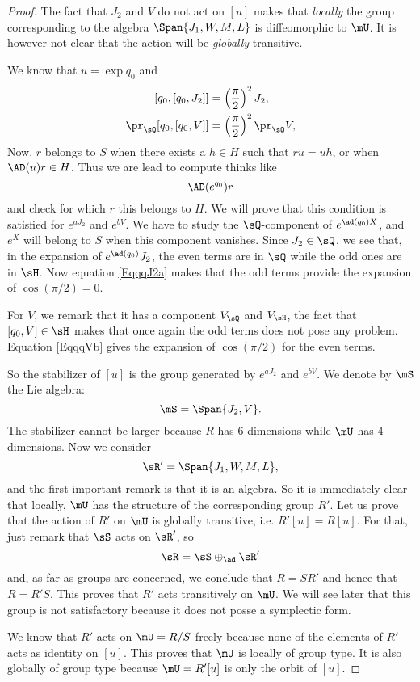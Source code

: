 \begin{proof}
The fact that $J_{2}$ and $V$ do not act on $[u]$ makes that \emph{locally} the group corresponding to the algebra $\Span\{ J_{1},W,M,L \}$ is diffeomorphic to $\mU$. It is however not clear that the action will be \emph{globally} transitive.

We know that $u=\exp q_0$ and
\begin{subequations}
\begin{align}
[q_0,[q_0,J_{2}]]&=\left( \frac{ \pi }{2} \right)^{2}J_{2},         \label{EqqqJ2a} \\
\pr_{\sQ}[q_0,[q_0,V]]&=\left( \frac{ \pi }{2} \right)^{2}\pr_{\sQ}V,       \label{EqqqVb}
\end{align}
\end{subequations}
Now, $r$ belongs to $S$ when there exists a $h\in H$ such that $ru=uh$, or when $\AD(u)r\in H$. Thus we are lead to compute thinks like
\[
  \AD( e^{q_0})r
\]
and check for which $r$ this belongs to $H$. We will prove that this condition is satisfied for $ e^{aJ_{2}}$ and $ e^{bV}$. We have to study the $\sQ$-component of $ e^{\ad(q_0)X}$, and $ e^{X}$ will belong to $S$ when this component vanishes. Since $J_2\in\sQ$, we see that, in the expansion of $ e^{\ad(q_0)}J_2$, the even terms are in $\sQ$ while the odd ones are in $\sH$. Now equation \eqref{EqqqJ2a} makes that the odd terms provide the expansion of $\cos(\pi/2)=0$.

For $V$, we remark that it has a component $V_{\sQ}$ and $V_{\sH}$, the fact that $[q_0,V]\in\sH$ makes that once again the odd terms does not pose any problem. Equation \eqref{EqqqVb} gives the expansion of $\cos(\pi/2)$ for the even terms.

So the stabilizer of $[u]$ is the group generated by $ e^{aJ_2}$ and $ e^{bV}$. We denote by $\mS$ the Lie algebra:
\[
  \mS=\Span\{ J_2,V \}.
\]
 The stabilizer cannot be larger because $R$ has $6$ dimensions while $\mU$ has $4$ dimensions. Now we consider
\[
  \sR'=\Span\{ J_1,W,M,L \},
\]
and the first important remark is that it is an algebra. So it is immediately clear that locally, $\mU$ has the structure of the corresponding group $R'$. Let us prove that the action of $R'$ on $\mU$ is globally transitive, i.e. $R'[u]=R[u]$. For that, just remark that $\sS$ acts on $\sR'$, so
\[
  \sR=\sS\oplus_{\ad}\sR'
\]
and, as far as groups are concerned, we conclude that $R=SR'$ and hence that $R=R'S$. This proves that $R'$ acts transitively on $\mU$. We will see later that this group is not satisfactory because it does not posse a symplectic form.

We know that $R'$ acts on $\mU=R/S$ freely because none of the elements of $R'$ acts as identity on $[u]$. This proves that $\mU$ is locally of group type. It is also globally of group type because $\mU=R'[u]$ is only the orbit of $[u]$.

\end{proof}

